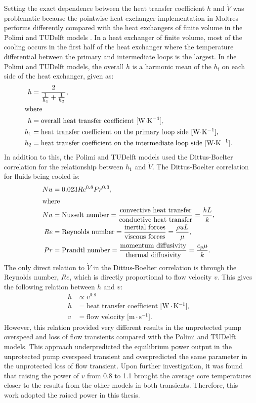 Setting the exact dependence between the heat transfer coefficient $h$ and
$\dot{V}$ was problematic because
the pointwise heat exchanger implementation in Moltres performs differently
compared with the heat exchangers of finite volume in the Polimi and TUDelft
models \cite{fiorina_modelling_2014}. In a heat exchanger of finite volume,
most of the cooling occurs in the first half of the heat exchanger where the
temperature differential between the primary and intermediate loops is the
largest. In the Polimi and TUDelft models, the overall $h$ is a
harmonic mean of the $h_i$ on each side of the heat exchanger, given as:
%
\begin{align}
    h &= \frac{2}{\frac{1}{h_1} + \frac{1}{h_2}}, \\
    \intertext{where}
    h &= \text{overall heat transfer coefficient
    [W$\cdot$K$^{-1}$],} \nonumber \\
    h_1 &= \text{heat transfer coefficient on the primary loop side
    [W$\cdot$K$^{-1}$],} \nonumber \\
    h_2 &= \text{heat transfer coefficient on the intermediate loop side
    [W$\cdot$K$^{-1}$].} \nonumber
\end{align}
%
In addition to this, the Polimi and TUDelft models used the Dittus-Boelter
correlation \cite{dittus_heat_1930} for the relationship between $h_1$ and
$\dot{V}$. The Dittus-Boelter correlation for fluids being cooled is:
%
\begin{align}
    Nu &= 0.023 Re^{0.8} Pr^{0.3}, \label{eq:db} \\
    \intertext{where}
    Nu &= \text{Nusselt number} =
    \frac{\text{convective heat transfer}}{\text{conductive heat transfer}}
    = \frac{hL}{k}, \nonumber \\
    Re &= \text{Reynolds number} =
    \frac{\text{inertial forces}}{\text{viscous forces}} =
    \frac{\rho u L}{\mu}, \nonumber \\
    Pr &= \text{Prandtl number} =
    \frac{\text{momentum diffusivity}}{\text{thermal diffusivity}} =
    \frac{c_p \mu}{k}. \nonumber
\end{align}
%
The only direct relation to $\dot{V}$ in the Dittus-Boelter correlation is
through the Reynolds number, $Re$, which is directly proportional to
flow velocity $v$. This gives the following relation between $h$ and $v$:
%
\begin{align}
    h &\propto v^{0.8} \label{eq:hv} \\
    h &= \text{heat transfer coefficient [W$\cdot$K$^{-1}$],} \nonumber \\
    v &= \text{flow velocity [m$\cdot$s$^{-1}$].} \nonumber
\end{align}
%
However, this relation provided very different results in the unprotected pump
overspeed and loss of flow transients compared with the Polimi and TUDelft
models. This approach underpredicted the equilibrium power output in the
unprotected pump overspeed transient and overpredicted the same parameter in
the unprotected loss of flow transient. Upon further investigation, it was
found that raising the power of $v$ from 0.8 to 1.1 brought the
average core temperatures closer to the results from the other models in both
transients. Therefore, this work adopted the raised power in this thesis.

